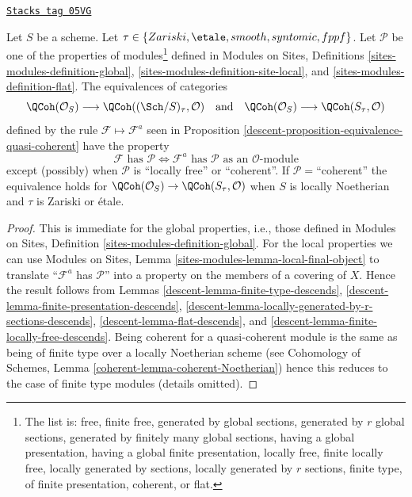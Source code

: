 \begin{lemma}
\label{descent-lemma-equivalence-quasi-coherent-properties}
\href{https://stacks.math.columbia.edu/tag/05VG}{\texttt{Stacks tag 05VG}}

Let $S$ be a scheme.
Let $\tau \in \{Zariski, \linebreak[0] \etale, \linebreak[0]
smooth, \linebreak[0] syntomic, \linebreak[0] fppf\}$.
Let $\mathcal{P}$ be one of the properties of modules\footnote{The list is:
free, finite free, generated by global sections,
generated by $r$ global sections, generated by finitely many global sections,
having a global presentation, having a global finite presentation,
locally free, finite locally free, locally generated by sections,
locally generated by $r$ sections, finite type, of finite presentation,
coherent, or flat.} defined in
Modules on Sites, Definitions \ref{sites-modules-definition-global},
\ref{sites-modules-definition-site-local}, and
\ref{sites-modules-definition-flat}.
The equivalences of categories
$$
\QCoh(\mathcal{O}_S)
\longrightarrow
\QCoh((\Sch/S)_\tau, \mathcal{O})
\quad\text{and}\quad
\QCoh(\mathcal{O}_S)
\longrightarrow
\QCoh(S_\tau, \mathcal{O})
$$
defined by the rule $\mathcal{F} \mapsto \mathcal{F}^a$ seen in
Proposition \ref{descent-proposition-equivalence-quasi-coherent}
have the property
$$
\mathcal{F}\text{ has }\mathcal{P}
\Leftrightarrow
\mathcal{F}^a\text{ has }\mathcal{P}\text{ as an }\mathcal{O}\text{-module}
$$
except (possibly) when $\mathcal{P}$ is ``locally free'' or ``coherent''.
If $\mathcal{P}=$``coherent'' the equivalence
holds for $\QCoh(\mathcal{O}_S) \to \QCoh(S_\tau, \mathcal{O})$
when $S$ is locally Noetherian and $\tau$ is Zariski or \'etale.
\end{lemma}

\begin{proof}

This is immediate for the global properties, i.e., those defined in
Modules on Sites, Definition \ref{sites-modules-definition-global}.
For the local properties we can use
Modules on Sites, Lemma \ref{sites-modules-lemma-local-final-object}
to translate ``$\mathcal{F}^a$ has $\mathcal{P}$'' into a property
on the members of a covering of $X$. Hence the result follows from
Lemmas \ref{descent-lemma-finite-type-descends},
\ref{descent-lemma-finite-presentation-descends},
\ref{descent-lemma-locally-generated-by-r-sections-descends},
\ref{descent-lemma-flat-descends}, and
\ref{descent-lemma-finite-locally-free-descends}.
Being coherent for a quasi-coherent module is the same as being
of finite type over a locally Noetherian scheme (see
Cohomology of Schemes, Lemma \ref{coherent-lemma-coherent-Noetherian})
hence this reduces
to the case of finite type modules (details omitted).
\end{proof}

